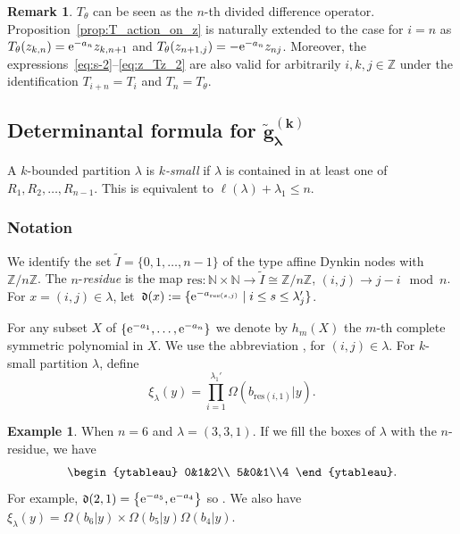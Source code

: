 \documentclass[10pt,a4paper]{amsart}
\numberwithin{equation}{section}
\newcommand{\co}{\xi}
\newcommand{\Iaf}{\tilde{I}}
\newcommand{\la}{\lambda}
\newcommand{\Z}{\mathbb{Z}}
\newcommand{\ha}{f}
\def\ZZ{\mathord{\mathbb{Z}}}
\theoremstyle{definition}
\newtheorem{Example}[Theorem]{Example}
\newtheorem{Remark}[Theorem]{Remark}
\begin{document}
\begin{Remark}
$T_\theta$ can be seen as the $n$-th divided difference operator.
Proposition~\ref{prop:T_action_on_z} is naturally extended to
the case for $i=n$ as
$
T_\theta(z_{k,n})={\rm e}^{-a_n}z_{k,n+1}$ and $ T_\theta(z_{n+1,j})=-{\rm e}^{-a_n}z_{nj}$.
Moreover, the expressions~\eqref{eq:s-2}--\eqref{eq:z_Tz_2} are also valid for arbitrarily $i,k,j\in \ZZ$ under the identification $T_{i+n}=T_i$ and $T_n=T_\theta$.
\end{Remark}

\subsection[Determinantal formula for g\^{}(k)\_lambda]{Determinantal formula for $\boldsymbol{\tilde{g}^{(k)}_\lambda}$}
\label{sec:det_formula}
A $k$-bounded partition $\lambda$ is \textit{$k$-small} if $\lambda$ is contained in at least one of $R_1,R_2,\dots,R_{n-1}$.
This is equivalent to $\ell(\la)+\la_1\le n$.

\subsubsection{Notation}
We identify the set $\Iaf=\{0,1,\dots,n-1\}$ of
the type  affine Dynkin nodes
with $\Z/n\Z$.
The $n$-\emph{residue} is the map
$
\mathrm{res}\colon
\mathbb{N}\times \mathbb{N}
\rightarrow \Iaf\cong \Z/n\Z$, $
(i,j)\to j-i \mod n$.
For $x=(i,j)\in \la$, let~${
\mathfrak{d}(x):=\{{\rm e}^{-a_{\mathrm{res}(s,j)}}\mid i\le s\le \la_j'\}}$.


For any subset $X$ of $\{{\rm e}^{-a_1},\dots,{\rm e}^{-a_n}\}$
we denote by $h_m(X)$ the $m$-th complete symmetric
polynomial in $X$.
We use
the abbreviation
\smash{$
\ha_m^{\langle i,j\rangle;\la}:=h_m(\mathfrak{d}(i,j))$},
for $(i,j)\in \la$.
For $k$-small partition $\la$, define
\begin{equation}
\label{eq:def xi}
\co_\la(y)=\prod_{i=1}^{\la_1'}\Omega(b_{\mathrm{res}(i,1)}|y).
\end{equation}




\begin{Example}\label{ex:h d}
When $n=6$ and
$
\lambda=(3,3,1)$.
If we fill the boxes of $\la$ with the $n$-residue, we have
\[
\begin{ytableau}
0&1&2\\
5&0&1\\4
\end{ytableau}.
\]
For example, $\mathfrak{d}(2,1)=\big\{{\rm e}^{-a_5},{\rm e}^{-a_4}\big\}$ so
\smash{$\ha_m^{\langle 2,1\rangle;\la}=h_m({\rm e}^{-a_5},{\rm e}^{-a_4})$}.
We also have
$
\co_\la(y)=\Omega(b_6|y)\allowbreak\times\Omega(b_5|y)\Omega(b_4|y)$.
\end{Example}
\end{document}

